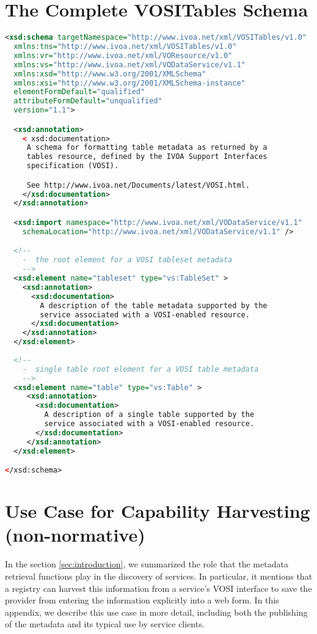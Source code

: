 \documentclass[11pt,letter]{ivoa}
\begin{document}
\section{The Complete VOSITables Schema}
\label{appendix:tables}
\begin{lstlisting}[language=XML]
<xsd:schema targetNamespace="http://www.ivoa.net/xml/VOSITables/v1.0"
  xmlns:tns="http://www.ivoa.net/xml/VOSITables/v1.0"
  xmlns:vr="http://www.ivoa.net/xml/VOResource/v1.0"
  xmlns:vs="http://www.ivoa.net/xml/VODataService/v1.1"
  xmlns:xsd="http://www.w3.org/2001/XMLSchema"
  xmlns:xsi="http://www.w3.org/2001/XMLSchema-instance"
  elementFormDefault="qualified"
  attributeFormDefault="unqualified"
  version="1.1">

  <xsd:annotation>
    < xsd:documentation>
     A schema for formatting table metadata as returned by a 
     tables resource, defined by the IVOA Support Interfaces 
     specification (VOSI). 

     See http://www.ivoa.net/Documents/latest/VOSI.html.  
    </xsd:documentation>
  </xsd:annotation>

  <xsd:import namespace="http://www.ivoa.net/xml/VODataService/v1.1"
    schemaLocation="http://www.ivoa.net/xml/VODataService/v1.1" />

  <!--
    -  the root element for a VOSI tableset metadata
    -->
  <xsd:element name="tableset" type="vs:TableSet" >
    <xsd:annotation>
      <xsd:documentation>
        A description of the table metadata supported by the 
        service associated with a VOSI-enabled resource.
      </xsd:documentation>
    </xsd:annotation>
  </xsd:element>
  
  <!--
    -  single table root element for a VOSI table metadata
    -->
  <xsd:element name="table" type="vs:Table" >
     <xsd:annotation>
       <xsd:documentation>
         A description of a single table supported by the
         service associated with a VOSI-enabled resource.
       </xsd:documentation>
     </xsd:annotation>
  </xsd:element>

</xsd:schema>
\end{lstlisting}

\section{Use Case for Capability Harvesting (non-normative)}
\label{appendix:harvesting}

 In the section \ref{sec:introduction}, we summarized the role that the
 metadata retrieval functions play in the discovery of services. In
 particular, it mentions that a registry can harvest this information
 from a service's VOSI interface to save the provider from entering the
 information explicitly into a web form. In this appendix, we describe
 this use case in more detail, including both the publishing of the
 metadata and its typical use by service clients.
\end{document}
